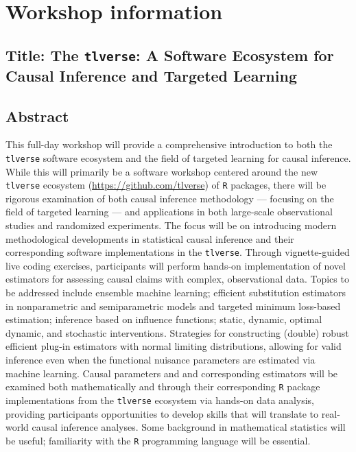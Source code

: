 \documentclass[a4paper,11pt]{texMemo}
\begin{document}
\maketitle
\vspace{-0.25in}
\section{Workshop information}

\subsection{\textbf{Title:} \small The \texttt{tlverse}: A Software Ecosystem
  for Causal Inference and Targeted Learning}

\subsection{Abstract}

This full-day workshop will provide a comprehensive introduction to both the
\texttt{tlverse} software ecosystem and the field of targeted learning for
causal inference. While this will primarily be a software workshop centered
around the new \texttt{tlverse} ecosystem (\url{https://github.com/tlverse}) of
\texttt{R} packages, there will be rigorous examination of both causal inference
methodology --- focusing on the field of targeted learning --- and applications
in both large-scale observational studies and randomized experiments. The focus
will be on introducing modern methodological developments in statistical causal
inference and their corresponding software implementations in the
\texttt{tlverse}. Through vignette-guided live coding exercises, participants
will perform hands-on implementation of novel estimators for assessing causal
claims with complex, observational data. Topics to be addressed include ensemble
machine learning; efficient substitution estimators in nonparametric and
semiparametric models and targeted minimum loss-based estimation; inference
based on influence functions; static, dynamic, optimal dynamic, and stochastic
interventions. Strategies for constructing (double) robust efficient plug-in
estimators with normal limiting distributions, allowing for valid inference even
when the functional nuisance parameters are estimated via machine learning.
Causal parameters and and corresponding estimators will be examined both
mathematically and through their corresponding \texttt{R} package
implementations from the \texttt{tlverse} ecosystem via hands-on data analysis,
providing participants opportunities to develop skills that will translate to
real-world causal inference analyses. Some background in mathematical statistics
will be useful; familiarity with the \texttt{R} programming language will be
essential.
\end{document}
